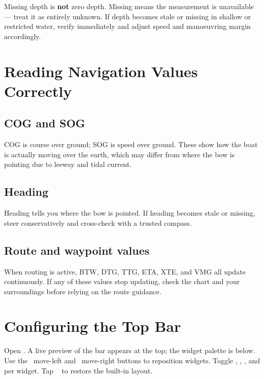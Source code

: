 \begin{warningbox}
Missing depth is \textbf{not} zero depth.
Missing means the measurement is unavailable --- treat it as entirely unknown.
If depth becomes stale or missing in shallow or restricted water, verify
immediately and adjust speed and manoeuvring margin accordingly.
\end{warningbox}

\section{Reading Navigation Values Correctly}

\subsection{COG and SOG}

COG is course over ground; SOG is speed over ground.
These show how the boat is actually moving over the earth, which may differ from
where the bow is pointing due to leeway and tidal current.

\subsection{Heading}

Heading tells you where the bow is pointed.
If heading becomes stale or missing, steer conservatively and cross-check with a
trusted compass.

\subsection{Route and waypoint values}

When routing is active, BTW, DTG, TTG, ETA, XTE, and VMG all update continuously.
If any of these values stop updating, check the chart and your surroundings before
relying on the route guidance.

\section{Configuring the Top Bar}

Open .
A live preview of the bar appears at the top; the widget palette is below.
Use the ~move-left and ~move-right
buttons to reposition widgets.
Toggle , , , and 
per widget.
Tap ~ to restore the built-in layout.


